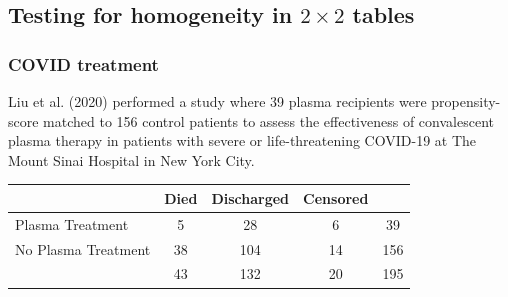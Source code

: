 \documentclass[a4paper]{article}\usepackage[]{graphicx}\usepackage[]{xcolor}
\begin{document}
\subsection{Testing for homogeneity in \texorpdfstring{\( 2 \times 2 \)}{2 x 2} tables}
\subsubsection{COVID treatment}
Liu et al. (2020) performed a study where 39 plasma recipients were propensity-score matched to 156 control patients to assess the effectiveness of convalescent plasma therapy in patients with severe or life-threatening COVID-19 at The Mount Sinai Hospital in New York City.
\begin{table}[H]
	\centering
	\begin{tabular}{@{}lcccc@{}}
	\toprule
						& Died & Discharged & Censored &     \\ \midrule
	Plasma Treatment    & 5    & 28         & 6        & 39  \\
	No Plasma Treatment & 38   & 104        & 14       & 156 \\ \midrule
						& 43   & 132        & 20       & 195 \\ \bottomrule
	\end{tabular}
\end{table}
\end{document}
